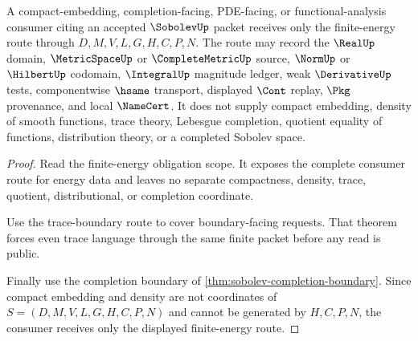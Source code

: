 \begin{theorem}
\label{thm:sobolev-compact-embedding-refusal-boundary}
A compact-embedding, completion-facing, PDE-facing, or functional-analysis consumer citing an accepted $\SobolevUp$ packet receives only the finite-energy route through $D,M,V,L,G,H,C,P,N$. The route may record the $\RealUp$ domain, $\MetricSpaceUp$ or $\CompleteMetricUp$ source, $\NormUp$ or $\HilbertUp$ codomain, $\IntegralUp$ magnitude ledger, weak $\DerivativeUp$ tests, componentwise $\hsame$ transport, displayed $\Cont$ replay, $\Pkg$ provenance, and local $\NameCert$. It does not supply compact embedding, density of smooth functions, trace theory, Lebesgue completion, quotient equality of functions, distribution theory, or a completed Sobolev space.
\end{theorem}
\begin{proof}
Read the finite-energy obligation scope. It exposes the complete consumer route for energy data and leaves no separate compactness, density, trace, quotient, distributional, or completion coordinate.

Use the trace-boundary route to cover boundary-facing requests. That theorem forces even trace language through the same finite packet before any read is public.

Finally use the completion boundary of \autoref{thm:sobolev-completion-boundary}. Since compact embedding and density are not coordinates of $S=(D,M,V,L,G,H,C,P,N)$ and cannot be generated by $H,C,P,N$, the consumer receives only the displayed finite-energy route.
\end{proof}
